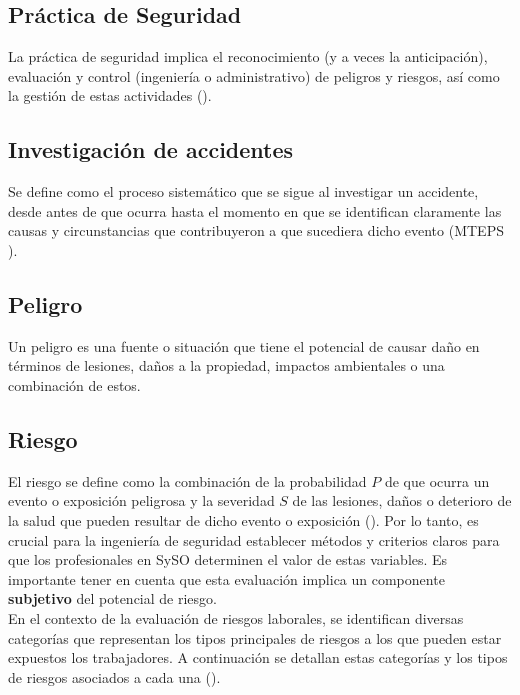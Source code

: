 \subsection{Práctica de Seguridad}
La práctica de seguridad implica el reconocimiento (y a veces la anticipación), evaluación y control (ingeniería o administrativo) de peligros y riesgos, así como la gestión de estas actividades (\cite{brauer2022safety}).

\subsection{Investigación de accidentes}
Se define como el proceso sistemático que se sigue al investigar un accidente, desde antes de que ocurra hasta el momento en que se identifican claramente las causas y circunstancias que contribuyeron a que sucediera dicho evento (MTEPS \citeyear{Bolivia1979}).

\subsection{Peligro}
Un peligro es una fuente o situación que tiene el potencial de causar daño en términos de lesiones, daños a la propiedad, impactos ambientales o una combinación de estos.

\subsection{Riesgo}
El riesgo se define como la combinación de la probabilidad \( P \) de que ocurra un evento o exposición peligrosa y la severidad \( S \) de las lesiones, daños o deterioro de la salud que pueden resultar de dicho evento o exposición (\cite{NTS-009/18}). %
Por lo tanto, es crucial para la ingeniería de seguridad establecer métodos y criterios claros para que los profesionales en SySO determinen el valor de estas variables. Es importante tener en cuenta que esta evaluación implica un componente \textbf{subjetivo} del potencial de riesgo.\\
En el contexto de la evaluación de riesgos laborales, se identifican diversas categorías que representan los tipos principales de riesgos a los que pueden estar expuestos los trabajadores. A continuación se detallan estas categorías y los tipos de riesgos asociados a cada una (\cite{cahuasiquitadiseno}).

